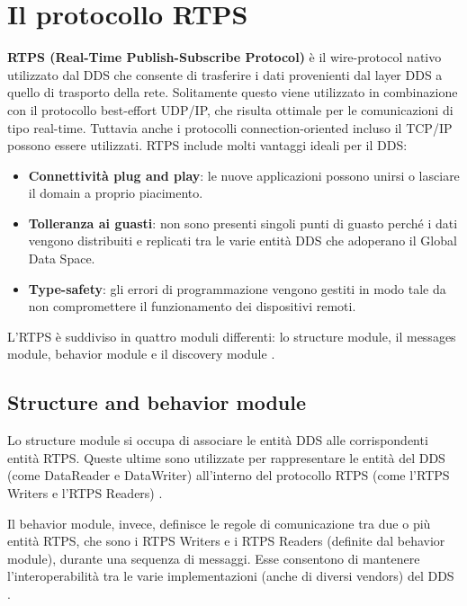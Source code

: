 \section{Il protocollo RTPS}
\textbf{RTPS (Real-Time Publish-Subscribe Protocol)} è il wire-protocol 
nativo utilizzato dal DDS che consente di trasferire i dati provenienti
dal layer DDS a quello di trasporto della rete.
Solitamente questo viene utilizzato in combinazione con il protocollo
best-effort
UDP/IP, che risulta ottimale per le comunicazioni di tipo real-time. Tuttavia 
anche i protocolli connection-oriented incluso il TCP/IP possono essere utilizzati. 
RTPS include molti vantaggi ideali per il DDS:
\begin{itemize}
    \item \textbf{Connettività plug and play}: le nuove applicazioni possono unirsi o 
    lasciare il domain a proprio piacimento.
    \item \textbf{Tolleranza ai guasti}: non sono presenti singoli punti di 
    guasto perché i dati vengono distribuiti e replicati tra le varie 
    entità DDS che adoperano il Global Data Space.
    \item \textbf{Type-safety}: gli errori di programmazione vengono gestiti 
    in modo tale da non compromettere il funzionamento 
    dei dispositivi remoti.
\end{itemize}
L'RTPS è suddiviso in quattro moduli differenti: lo structure module, il 
messages module, behavior module e il discovery module \cite{ddsrtps}.

\subsection{Structure and behavior module}
Lo structure module si occupa di associare le entità DDS alle corrispondenti
entità RTPS. Queste ultime sono utilizzate 
per rappresentare le entità del DDS (come DataReader e DataWriter) 
all'interno del protocollo RTPS (come l'RTPS Writers e l'RTPS Readers) 
\cite{ddsrtps}.

Il behavior module, invece, definisce le regole di comunicazione tra
due o più entità RTPS, che sono i RTPS Writers e i RTPS Readers 
(definite dal behavior module), durante 
una sequenza di messaggi.
Esse consentono di mantenere l'interoperabilità tra le varie 
implementazioni (anche di diversi vendors) del DDS \cite{ddsrtps}.

